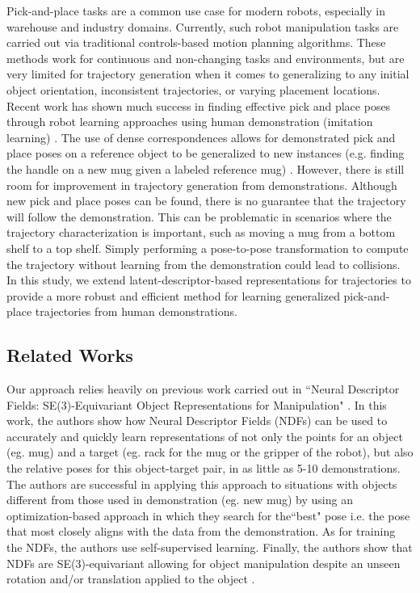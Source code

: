 \documentclass[10pt,twocolumn,letterpaper]{article}
\begin{document}
Pick-and-place tasks are a common use case for modern robots, especially in warehouse and industry domains. Currently, such robot manipulation tasks are carried out via traditional controls-based motion planning algorithms. These methods work for continuous and non-changing tasks and environments, but are very limited for trajectory generation when it comes to generalizing to any initial object orientation, inconsistent trajectories, or varying placement locations. Recent work has shown much success in finding effective pick and place poses through robot learning approaches using human demonstration (imitation learning) \cite{simeonovdu2021ndf}. The use of dense correspondences allows for demonstrated pick and place poses on a reference object to be generalized to new instances (e.g. finding the handle on a new mug given a labeled reference mug) \cite{simeonovdu2021ndf}. However, there is still room for improvement in trajectory generation from demonstrations. Although new pick and place poses can be found, there is no guarantee that the trajectory will follow the demonstration. This can be problematic in scenarios where the trajectory characterization is important, such as moving a mug from a bottom shelf to a top shelf. Simply performing a pose-to-pose transformation to compute the trajectory without learning from the demonstration could lead to collisions. In this study, we extend latent-descriptor-based representations for trajectories to provide a more robust and efficient method for learning generalized pick-and-place trajectories from human demonstrations.

\subsection{Related Works}

Our approach relies heavily on previous work carried out in ``Neural Descriptor Fields: SE(3)-Equivariant Object Representations for Manipulation" \cite{simeonovdu2021ndf}. In this work, the authors show how Neural Descriptor Fields (NDFs) can be used to accurately and quickly learn representations of not only the points for an object (eg. mug) and a target (eg. rack for the mug or the gripper of the robot), but also the relative poses for this object-target pair, in as little as 5-10 demonstrations. The authors are successful in applying this approach to situations with objects different from those used in demonstration (eg. new mug) by using an optimization-based approach in which they search for the``best" pose i.e. the pose that most closely aligns with the data from the demonstration. As for training the NDFs, the authors use self-supervised learning. Finally, the authors show that NDFs are SE(3)-equivariant allowing for object manipulation despite an unseen rotation and/or translation applied to the object \cite{simeonovdu2021ndf}.
\end{document}
